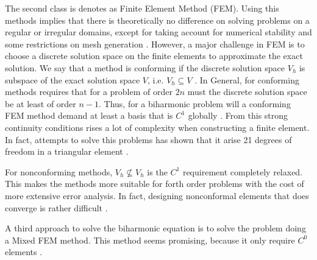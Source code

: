 The second class is denotes as Finite Element Method (FEM). Using this methods implies that there is theoretically no difference on solving problems on a regular or irregular domains, except for taking account for numerical stability and some
restrictions on mesh generation \cite{chen08}. However, a major challenge in FEM is to choose a discrete solution space on the finite elements to approximate the exact solution. We say that a method is conforming if the discrete solution space
$V_{h}$ is subspace of the exact solution space $V$\cite{shi02, brenner07math}, i.e. $V_{h} \subseteq  V$  . In General, for conforming methods requires that for a problem of order $2n$ must the discrete solution space be at least of order $n-1$. Thus, for a biharmonic problem
will a conforming FEM method demand at least a basis that is $C^1$ globally \cite{shi02}. From this strong continuity conditions rises a lot of complexity when constructing a finite element. In fact, attempts to solve this problems has shown that it
arise 21 degrees of freedom in a triangular element \cite{nair21}.

For nonconforming methods, $V_{h} \not \subseteq  V_{h}$ is the $C^{1}$ requirement completely relaxed. This makes the methods more suitable for forth order problems with the cost of more extensive error analysis. In fact, designing nonconformal
elements that does converge is rather difficult \cite{shi02, nair21}.

A third approach to solve the biharmonic equation is to solve the problem doing a Mixed FEM method. This method seems promising, because it only require $C^{0}$ elements .







